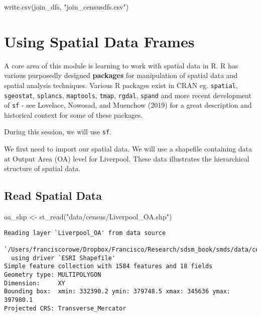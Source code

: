 \documentclass[
  letterpaper,
  krantz2]{style/krantz}
\newenvironment{Shaded}{\begin{snugshade}}{\end{snugshade}}
\newcommand{\FunctionTok}[1]{\textcolor[rgb]{0.28,0.35,0.67}{#1}}
\newcommand{\NormalTok}[1]{\textcolor[rgb]{0.00,0.23,0.31}{#1}}
\newcommand{\OtherTok}[1]{\textcolor[rgb]{0.00,0.23,0.31}{#1}}
\newcommand{\StringTok}[1]{\textcolor[rgb]{0.13,0.47,0.30}{#1}}
\begin{document}
\begin{Shaded}
\begin{Highlighting}[]
\FunctionTok{write.csv}\NormalTok{(join\_dfs, }\StringTok{"join\_censusdfs.csv"}\NormalTok{)}
\end{Highlighting}
\end{Shaded}

\hypertarget{using-spatial-data-frames}{%
\section{Using Spatial Data Frames}\label{using-spatial-data-frames}}

A core area of this module is learning to work with spatial data in R. R
has various purposedly designed \textbf{packages} for manipulation of
spatial data and spatial analysis techniques. Various R packages exist
in CRAN eg. \texttt{spatial}, \texttt{sgeostat}, \texttt{splancs},
\texttt{maptools}, \texttt{tmap}, \texttt{rgdal}, \texttt{spand} and
more recent development of \texttt{sf} - see Lovelace, Nowosad, and
Muenchow (2019) for a great description and historical context for some
of these packages.

During this session, we will use \texttt{sf}.

We first need to import our spatial data. We will use a shapefile
containing data at Output Area (OA) level for Liverpool. These data
illustrates the hierarchical structure of spatial data.

\hypertarget{read-spatial-data}{%
\subsection{Read Spatial Data}\label{read-spatial-data}}

\begin{Shaded}
\begin{Highlighting}[]
\NormalTok{oa\_shp }\OtherTok{\textless{}{-}} \FunctionTok{st\_read}\NormalTok{(}\StringTok{"data/census/Liverpool\_OA.shp"}\NormalTok{)}
\end{Highlighting}
\end{Shaded}

\begin{verbatim}
Reading layer `Liverpool_OA' from data source 
  `/Users/franciscorowe/Dropbox/Francisco/Research/sdsm_book/smds/data/census/Liverpool_OA.shp' 
  using driver `ESRI Shapefile'
Simple feature collection with 1584 features and 18 fields
Geometry type: MULTIPOLYGON
Dimension:     XY
Bounding box:  xmin: 332390.2 ymin: 379748.5 xmax: 345636 ymax: 397980.1
Projected CRS: Transverse_Mercator
\end{verbatim}
\end{document}
